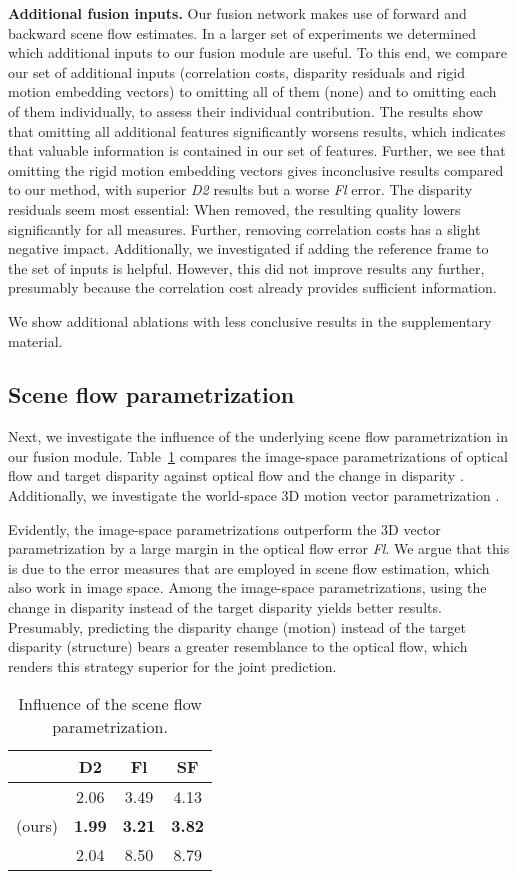 \documentclass[10pt,twocolumn,letterpaper]{article}
\begin{document}
\medskip
\noindent
\textbf{Additional fusion inputs.}
Our fusion network makes use of forward and backward scene flow estimates.
In a larger set of experiments we determined which additional inputs to our fusion module are useful.
To this end, we compare our set of additional inputs (correlation costs, disparity residuals and rigid motion embedding vectors) to omitting all of them (none) and to omitting each of them individually, to assess their individual contribution.
The results show that omitting all additional features significantly worsens results, which indicates that valuable information is contained in our set of features.
Further, we see that omitting the rigid motion embedding vectors gives inconclusive results compared to our method, with superior \emph{D2} results but a worse \emph{Fl} error.
The disparity residuals seem most essential:
When removed, the resulting quality lowers significantly for all measures.
Further, removing correlation costs has a slight negative impact.
Additionally, we investigated if adding the reference frame  to the set of inputs \cite{Ren2019_FlowTemporalFusion} is helpful.
However, this did not improve results any further, presumably because the correlation cost already provides sufficient information.

We show additional ablations with less conclusive results in the supplementary material.

\subsection{Scene flow parametrization}
Next, we investigate the influence of the underlying scene flow parametrization in our fusion module.
Table~\ref{tab:sf_param} compares the image-space parametrizations of optical flow and target disparity  against optical flow and the change in disparity .
Additionally, we investigate the world-space 3D motion vector parametrization .

Evidently, the image-space parametrizations outperform the 3D vector parametrization by a large margin in the optical flow error \emph{Fl}.
We argue that this is due to the error measures that are employed in scene flow estimation, which also work in image space.
Among the image-space parametrizations, using the change in disparity instead of the target disparity yields better results.
Presumably, predicting the disparity change (motion) instead of the target disparity (structure) bears a greater resemblance to the optical flow, which renders this strategy superior for the joint prediction.
\begin{table}
\caption{Influence of the scene flow parametrization.}
\label{tab:sf_param}
\begin{center}
\begin{tabular}{lccc}
\toprule
& D2 & Fl & SF
\\
\midrule
\midrule
 & 2.06 & 3.49 & 4.13
\\
 (ours) & \textbf{1.99} & \textbf{3.21} & \textbf{3.82}
\\
 & 2.04 & 8.50 & 8.79
\\
\bottomrule
\end{tabular}
\end{center}
\end{table}
\end{document}
